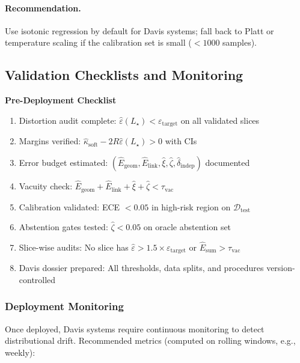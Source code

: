 \documentclass[11pt]{article}
\begin{document}
\paragraph{Recommendation.}
Use isotonic regression by default for Davis systems; fall back to Platt or temperature scaling if the calibration set is small ($<1000$ samples).

\subsection{Validation Checklists and Monitoring}
\label{subsec:validation-checklists}

\begin{mdframed}[linewidth=0.5pt,backgroundcolor=black!1]
\noindent\textbf{Pre-Deployment Checklist}
\begin{enumerate}[leftmargin=*,itemsep=2pt]
  \item[$\square$] Distortion audit complete: $\hat\varepsilon(L_\star) < \varepsilon_{\text{target}}$ on all validated slices
  \item[$\square$] Margins verified: $\hat\kappa_{\mathrm{soft}} - 2R\hat\varepsilon(L_\star) > 0$ with CIs
  \item[$\square$] Error budget estimated: $(\hat E_{\mathrm{geom}}, \hat E_{\mathrm{link}}, \hat\xi, \hat\zeta, \hat\delta_{\mathrm{indep}})$ documented
  \item[$\square$] Vacuity check: $\hat E_{\mathrm{geom}} + \hat E_{\mathrm{link}} + \hat\xi + \hat\zeta < \tau_{\mathrm{vac}}$
  \item[$\square$] Calibration validated: ECE $< 0.05$ in high-risk region on $\mathcal{D}_{\mathrm{test}}$
  \item[$\square$] Abstention gates tested: $\hat\zeta < 0.05$ on oracle abstention set
  \item[$\square$] Slice-wise audits: No slice has $\hat\varepsilon > 1.5 \times \varepsilon_{\text{target}}$ or $\hat E_{\text{sum}} > \tau_{\mathrm{vac}}$
  \item[$\square$] Davis dossier prepared: All thresholds, data splits, and procedures version-controlled
\end{enumerate}
\end{mdframed}

\subsubsection{Deployment Monitoring}

Once deployed, Davis systems require continuous monitoring to detect distributional drift. Recommended metrics (computed on rolling windows, e.g., weekly):
\end{document}
